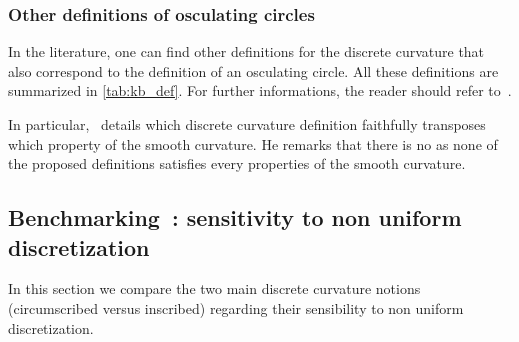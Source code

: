 \subsubsection{Other definitions of osculating circles}
In the literature, one can find other definitions for the discrete curvature that also correspond to the definition of an osculating circle. All these definitions are summarized in \cref{tab:kb_def}. For further informations, the reader should refer to~\cite{Carroll2014, Vouga2014, Bobenko2015, Romon2013}.

In particular,~\citet{Vouga2014} details which discrete curvature definition  faithfully transposes which property of the smooth curvature. He remarks that there is no  as none of the proposed definitions satisfies every properties of the smooth curvature.

\subsection{Benchmarking~: sensitivity to non uniform discretization}\label{sec=bench_disc}
In this section we compare the two main discrete curvature notions (circumscribed versus inscribed) regarding their sensibility to non uniform discretization.


